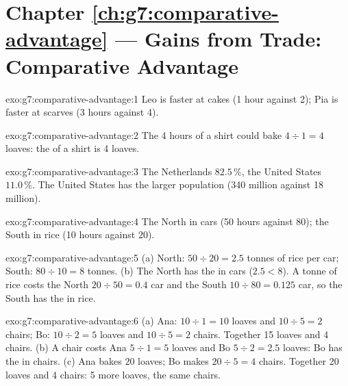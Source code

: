 \section*{Chapter \ref{ch:g7:comparative-advantage} --- Gains from Trade: Comparative Advantage}

\begin{solution}{exo:g7:comparative-advantage:1}
Leo is faster at cakes (1 hour against 2); Pia is faster at scarves (3 hours against 4).
\end{solution}

\begin{solution}{exo:g7:comparative-advantage:2}
The 4 hours of a shirt could bake $4 \div 1 = 4$ loaves: the  of a shirt
is 4 loaves.
\end{solution}

\begin{solution}{exo:g7:comparative-advantage:3}
The Netherlands $82.5\,\%$, the United States $11.0\,\%$. The United States has the larger
population (340 million against 18 million).
\end{solution}

\begin{solution}{exo:g7:comparative-advantage:4}
The North in cars (50 hours against 80); the South in rice (10 hours against 20).
\end{solution}

\begin{solution}{exo:g7:comparative-advantage:5}
(a) North: $50 \div 20 = 2.5$ tonnes of rice per car; South: $80 \div 10 = 8$ tonnes.
(b) The North has the  in cars ($2.5 < 8$). A tonne of rice costs
the North $20 \div 50 = 0.4$ car and the South $10 \div 80 = 0.125$ car, so the South has
the  in rice.
\end{solution}

\begin{solution}{exo:g7:comparative-advantage:6}
(a) Ana: $10 \div 1 = 10$ loaves and $10 \div 5 = 2$ chairs; Bo: $10 \div 2 = 5$ loaves
and $10 \div 5 = 2$ chairs. Together 15 loaves and 4 chairs. (b) A chair costs Ana
$5 \div 1 = 5$ loaves and Bo $5 \div 2 = 2.5$ loaves: Bo has the  in
chairs. (c) Ana bakes $20$ loaves; Bo makes $20 \div 5 = 4$ chairs. Together 20 loaves and
4 chairs: 5 more loaves, the same chairs.
\end{solution}

